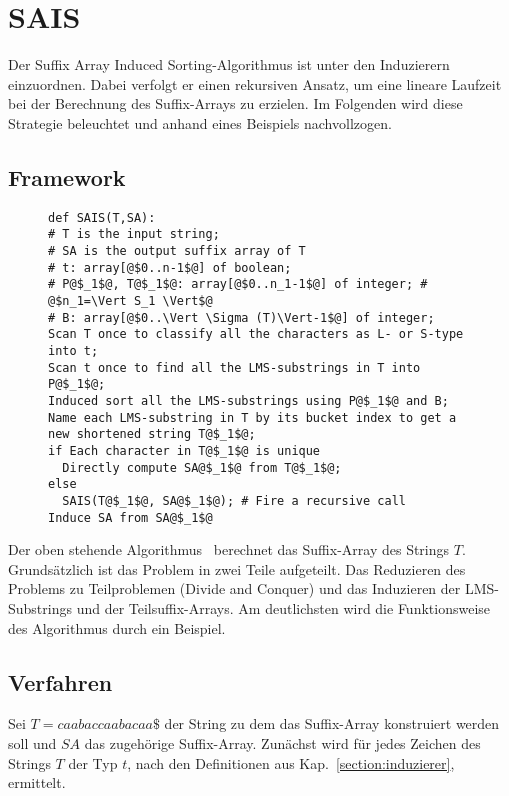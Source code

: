 \section{SAIS}


Der Suffix Array Induced Sorting-Algorithmus ist unter den Induzierern einzuordnen. Dabei verfolgt er einen rekursiven Ansatz, um eine lineare Laufzeit bei der Berechnung des Suffix-Arrays zu erzielen. Im Folgenden wird diese Strategie beleuchtet und anhand eines Beispiels nachvollzogen.

\subsection{Framework}
\label{saisAlg}


\begin{figure}[h]
\begin{verbatim}
def SAIS(T,SA):
# T is the input string;
# SA is the output suffix array of T
# t: array[@$0..n-1$@] of boolean;
# P@$_1$@, T@$_1$@: array[@$0..n_1-1$@] of integer; # @$n_1=\Vert S_1 \Vert$@
# B: array[@$0..\Vert \Sigma (T)\Vert-1$@] of integer;
Scan T once to classify all the characters as L- or S-type
into t;
Scan t once to find all the LMS-substrings in T into P@$_1$@;
Induced sort all the LMS-substrings using P@$_1$@ and B;
Name each LMS-substring in T by its bucket index to get a
new shortened string T@$_1$@;
if Each character in T@$_1$@ is unique
  Directly compute SA@$_1$@ from T@$_1$@;
else
  SAIS(T@$_1$@, SA@$_1$@); # Fire a recursive call
Induce SA from SA@$_1$@ 
\end{verbatim}
\end{figure}


\noindent Der oben stehende Algorithmus~\cite[Fig.~1]{saca:6} berechnet das Suffix-Array des Strings $T$. Grundsätzlich ist das Problem in zwei Teile aufgeteilt. Das Reduzieren des Problems zu Teilproblemen (Divide and Conquer) und das Induzieren der LMS-Substrings und der Teilsuffix-Arrays. Am deutlichsten wird die Funktionsweise des Algorithmus durch ein Beispiel.

\subsection{Verfahren}
Sei $T=caabaccaabacaa\$$ der String zu dem das Suffix-Array konstruiert werden soll und $SA$ das zugehörige Suffix-Array. Zunächst wird für jedes Zeichen des Strings $T$ der Typ $t$, nach den Definitionen aus Kap.~\ref{section:induzierer}, ermittelt.

